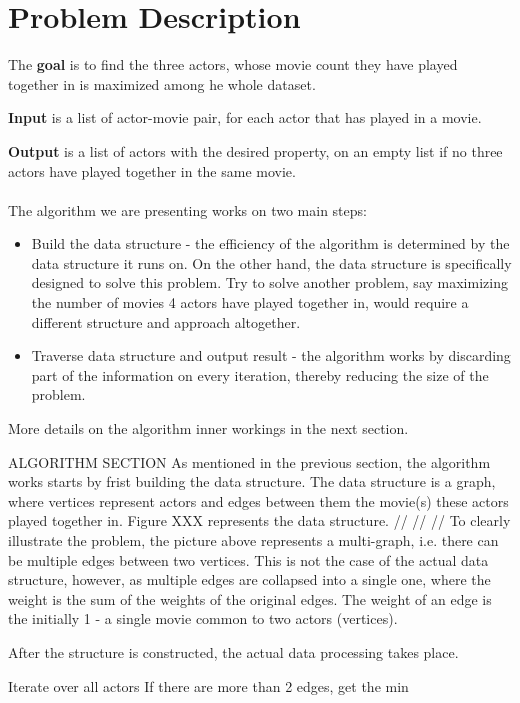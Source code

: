 \label{Problem Description}
\section{Problem Description}

The \textbf{goal} is to find the three actors, whose movie count they have played together in is maximized among he whole dataset.

\textbf{Input} is a list of actor-movie pair, for each actor that has played in a movie.

\textbf{Output} is a list of actors with the desired property, on an empty list if no three actors have played together in the same movie.
\\
\\
The algorithm we are presenting works on two main steps:
\begin{itemize}
  \item Build the data structure - the efficiency of the algorithm is determined by the data structure it runs on. On the other hand, the data structure is specifically designed to solve this problem. Try to solve another problem, say maximizing the number of movies 4 actors have played together in, would require a different  structure and approach altogether.
  \item Traverse data structure and output result - the algorithm works by  discarding part of the information on every iteration, thereby reducing the size of the problem.
\end{itemize} 

More details on the algorithm inner workings in the next section.




ALGORITHM SECTION
As mentioned in the previous section, the algorithm works starts by frist building the data structure. The data structure is a graph, where vertices represent actors and edges between them the movie(s) these actors played together in. Figure XXX represents the data structure.
//
//
//
To clearly illustrate the problem, the picture above represents a multi-graph, i.e. there can be multiple edges between two vertices. This is not the case of the actual data structure, however, as multiple edges are collapsed into a single one, where the weight is the sum of the weights of the original edges. The weight of an edge is the initially 1 - a single movie common to two actors (vertices). 

After the structure is constructed, the actual data processing takes place.

Iterate over all actors
If there are more than 2 edges,
get the min